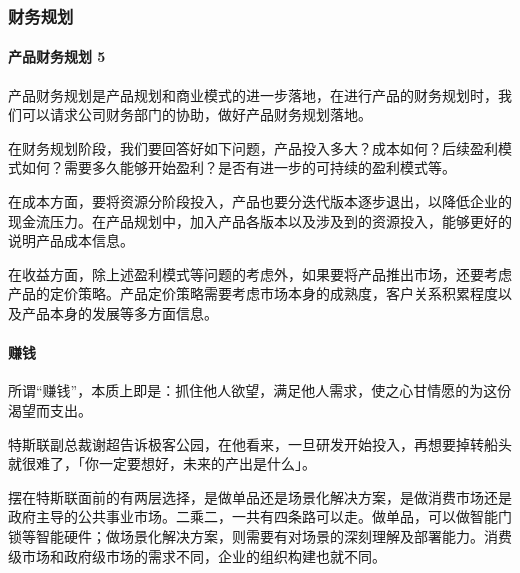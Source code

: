 \documentclass[letterpaper,11pt,english]{sphinxmanual}
\begin{document}
\subsubsection{财务规划}
\label{\detokenize{chapter_introduction/money:id1}}\label{\detokenize{chapter_introduction/money::doc}}

\paragraph{产品财务规划 5\sphinxfootnotemark[41]}
\label{\detokenize{chapter_introduction/money:id2}}%
\begin{footnotetext}[41]\sphinxAtStartFootnote
{}
%
\end{footnotetext}\ignorespaces 
产品财务规划是产品规划和商业模式的进一步落地，在进行产品的财务规划时，我们可以请求公司财务部门的协助，做好产品财务规划落地。

在财务规划阶段，我们要回答好如下问题，产品投入多大？成本如何？后续盈利模式如何？需要多久能够开始盈利？是否有进一步的可持续的盈利模式等。

在成本方面，要将资源分阶段投入，产品也要分迭代版本逐步退出，以降低企业的现金流压力。在产品规划中，加入产品各版本以及涉及到的资源投入，能够更好的说明产品成本信息。

在收益方面，除上述盈利模式等问题的考虑外，如果要将产品推出市场，还要考虑产品的定价策略。产品定价策略需要考虑市场本身的成熟度，客户关系积累程度以及产品本身的发展等多方面信息。


\paragraph{赚钱}
\label{\detokenize{chapter_introduction/money:id3}}
所谓“赚钱”，本质上即是：抓住他人欲望，满足他人需求，使之心甘情愿的为这份渴望而支出。

特斯联副总裁谢超告诉极客公园，在他看来，一旦研发开始投入，再想要掉转船头就很难了，「你一定要想好，未来的产出是什么」。%
\begin{footnote}[42]\sphinxAtStartFootnote
{}
%
\end{footnote}

摆在特斯联面前的有两层选择，是做单品还是场景化解决方案，是做消费市场还是政府主导的公共事业市场。二乘二，一共有四条路可以走。做单品，可以做智能门锁等智能硬件；做场景化解决方案，则需要有对场景的深刻理解及部署能力。消费级市场和政府级市场的需求不同，企业的组织构建也就不同。
\end{document}
